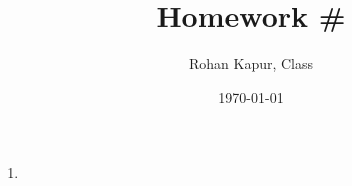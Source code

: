 \documentclass[11pt,twoside]{article}
\title{Homework \#}
\author{Rohan Kapur, Class}
\date{\today}
\begin{document}
    \maketitle

    \begin{enumerate}
        \item
    \end{enumerate}
\end{document}
